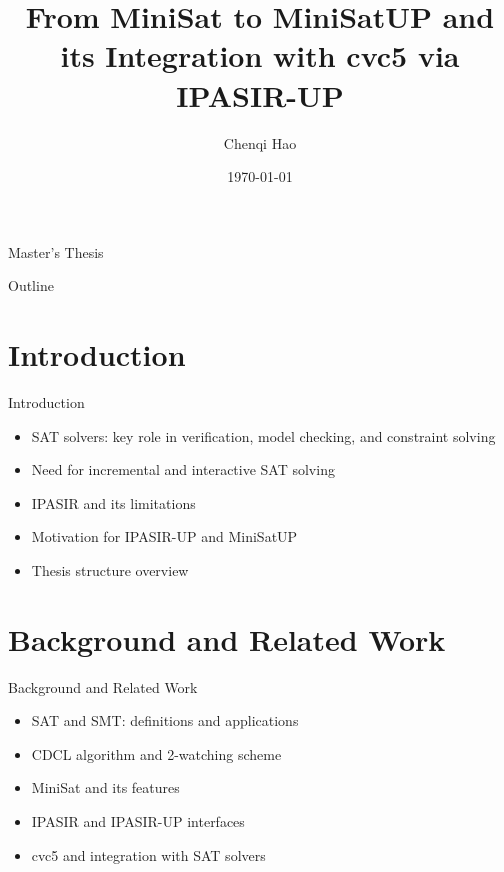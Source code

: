 \documentclass{beamer}
\title[MiniSatUP and its Integration with cvc5]{From MiniSat to MiniSatUP and its Integration with cvc5 via IPASIR-UP}
\author{Chenqi Hao}
\institute{University of Freiburg}
\date{\today}
\begin{document}
\begin{frame}
  \centering Master's Thesis
  \titlepage
\end{frame}

\begin{frame}{Outline}
  \tableofcontents
\end{frame}

\section{Introduction}
\begin{frame}{Introduction}
  \begin{itemize}
    \item SAT solvers: key role in verification, model checking, and constraint solving
    \item Need for incremental and interactive SAT solving
    \item IPASIR and its limitations
    \item Motivation for IPASIR-UP and MiniSatUP
    \item Thesis structure overview
  \end{itemize}
\end{frame}

\section{Background and Related Work}
\begin{frame}{Background and Related Work}
  \begin{itemize}
    \item SAT and SMT: definitions and applications
    \item CDCL algorithm and 2-watching scheme
    \item MiniSat and its features
    \item IPASIR and IPASIR-UP interfaces
    \item cvc5 and integration with SAT solvers
  \end{itemize}
\end{frame}
\end{document}
